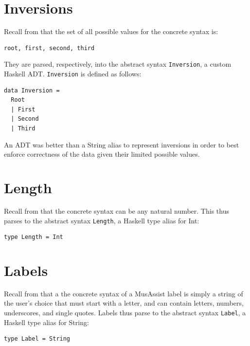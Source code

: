 \documentclass{report}
\newcommand\param[1]{\textttu{<#1>}}
\begin{document}
\section{Inversions}
Recall from  that the set of all possible values for the concrete syntax \param{INVERSION} is:
\begin{verbatim}
root, first, second, third
\end{verbatim}

They are parsed, respectively, into the abstract syntax \verb.Inversion., a custom Haskell ADT. \verb.Inversion. is defined as follows:

\begin{verbatim}
data Inversion = 
  Root 
  | First 
  | Second 
  | Third
\end{verbatim}

An ADT was better than a String alias to represent inversions in order to best enforce correctness of the data given their limited possible values. 

\section{Length}

Recall from  that the concrete syntax \param{LENGTH} can be any natural number. This thus parses to the abstract syntax \verb.Length., a Haskell type alias for Int:

\begin{verbatim}
type Length = Int
\end{verbatim}
 
\section{Labels}
Recall from  that a the concrete syntax of a MusAssist label is simply a string of the user's choice that must start with a letter, and can contain letters, numbers, underscores, and single quotes. Labels thus parse to the abstract syntax \verb.Label., a Haskell type alias for String:

\begin{verbatim}
type Label = String
\end{verbatim}
\end{document}
